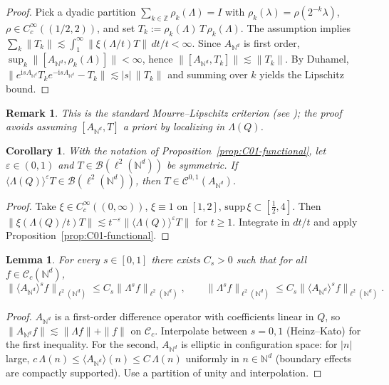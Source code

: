 \documentclass[10pt]{amsart}
\newcommand{\Z}{{\mathbb{Z}}}
\newcommand{\N}{{\mathbb{N}}}
\newcommand{\1}{{\mathbb{I}}}
\newcommand{\Bc}{\mathcal{B}}
\newcommand{\Cc}{\mathcal{C}}
\numberwithin{equation}{section}
\newtheorem{lemma}[theorem]{Lemma}%
\newtheorem{remark}[theorem]{Remark}%
\newtheorem{corollary}[theorem]{Corollary}%
\begin{document}
\begin{proof}
Pick a dyadic partition $\sum_{k\in\Z}\rho_k(\Lambda)=I$ with $\rho_k(\lambda)=\rho(2^{-k}\lambda)$, $\rho\in C_c^\infty((1/2,2))$, and set $T_k:=\rho_k(\Lambda)\,T\,\rho_k(\Lambda)$. The assumption implies $\sum_k\|T_k\|\lesssim\int_1^\infty\|\xi(\Lambda/t)T\|\,dt/t<\infty$.
Since $A_{\N^d}$ is first order, $\sup_k\|[A_{\N^d},\rho_k(\Lambda)]\|<\infty$, hence $\|[A_{\N^d},T_k]\|\lesssim\|T_k\|$.
By Duhamel, $\|e^{\mathrm i sA_{\N^d}}T_ke^{-\mathrm i sA_{\N^d}}-T_k\|\lesssim |s|\,\|T_k\|$ and summing over $k$ yields the Lipschitz bound.
\end{proof}

\begin{remark}
This is the standard Mourre--Lipschitz criterion (see \cite{ABG}); the proof avoids assuming $[A_{\N^d},T]$ a priori by localizing in $\Lambda(Q)$.
\end{remark}

\begin{corollary}\label{cor:hypothesis1}
With the notation of Proposition~\ref{prop:C01-functional}, let $\varepsilon\in(0,1)$ and $T\in\Bc(\ell^2(\N^d))$ be symmetric.
If $\langle\Lambda(Q)\rangle^{\varepsilon}T\in\Bc(\ell^2(\N^d))$, then $T\in\Cc^{0,1}(A_{\N^d})$.
\end{corollary}

\begin{proof}
Take $\xi\in C_c^\infty((0,\infty))$, $\xi\equiv1$ on $[1,2]$, $\mathrm{supp}\,\xi\subset[\tfrac12,4]$.
Then $\|\xi(\Lambda(Q)/t)T\|\lesssim t^{-\varepsilon}\|\langle\Lambda(Q)\rangle^{\varepsilon}T\|$ for $t\ge1$. Integrate in $dt/t$ and apply Proposition~\ref{prop:C01-functional}.
\end{proof}

\begin{lemma}\label{lem:interpolation_weights}
For every $s\in[0,1]$ there exists $C_s>0$ such that for all $f\in\Cc_c(\N^d)$,
\begin{equation}\label{eq:interp}
\|\langle A_{\N^d}\rangle^s f\|_{\ell^2(\N^d)}\le C_s\|\Lambda^s f\|_{\ell^2(\N^d)},\qquad
\|\Lambda^s f\|_{\ell^2(\N^d)}\le C_s\|\langle A_{\N^d}\rangle^s f\|_{\ell^2(\N^d)}.
\end{equation}
\end{lemma}

\begin{proof}
$A_{\N^d}$ is a first-order difference operator with coefficients linear in $Q$, so $\|A_{\N^d} f\|\lesssim \|\Lambda f\|+\|f\|$ on $\Cc_c$. Interpolate between $s=0,1$ (Heinz--Kato) for the first inequality. For the second, $A_{\N^d}$ is elliptic in configuration space: for $|n|$ large, $c\,\Lambda(n)\le \langle A_{\N^d}\rangle(n)\le C\,\Lambda(n)$ uniformly in $n\in\N^d$ (boundary effects are compactly supported). Use a partition of unity and interpolation.
\end{proof}
\end{document}
